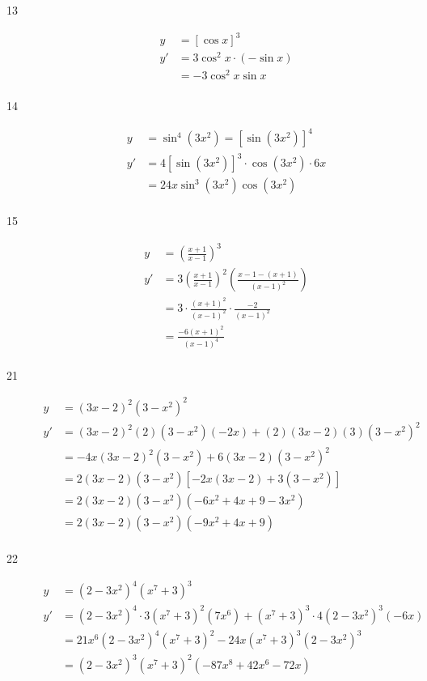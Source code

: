 \documentclass{exam}
\begin{document}
\begin{description}
\item[13]
\begin{align*}
  y  &= [ \cos x]^3 \\
  y' &= 3 \cos^2 x \cdot (- \sin x) \\
     &= -3 \cos^2 x \sin x \\
\end{align*}

\item[14]
\begin{align*}
  y  &= \sin^4(3x^2) = [\sin(3x^2)]^4 \\
  y' &= 4 [\sin (3x^2)]^3 \cdot \cos(3x^2) \cdot 6x \\
     &= 24x \sin^3(3x^2) \cos(3x^2) \\
\end{align*}

\item[15]
\begin{align*}
  y  &= \left( \frac{x+1}{x-1} \right)^3 \\
  y' &= 3 \left( \frac{x+1}{x-1} \right)^2 \left( \frac{x-1 - (x + 1)}{(x-1)^2} \right) \\
     &= 3 \cdot \frac{(x+1)^2}{(x-1)^2} \cdot \frac{-2}{(x-1)^2} \\
     &= \frac{-6 (x+1)^2}{(x-1)^4} \\
\end{align*}

\item[21]
\begin{align*}
  y  &= (3x - 2)^2 (3 - x^2)^2 \\
  y' &= (3x - 2)^2 (2)(3 - x^2)(-2x) + (2)(3x - 2)(3)(3-x^2)^2 \\
     &= -4x (3x - 2)^2(3 - x^2) + 6(3x - 2)(3-x^2)^2 \\
     &= 2(3x-2)(3-x^2) [-2x (3x - 2) + 3(3-x^2) ] \\
     &= 2(3x-2)(3-x^2)(-6x^2 + 4x + 9 - 3x^2) \\
     &= 2(3x-2)(3-x^2)(-9x^2 + 4x + 9) \\
\end{align*}

\item[22]
\begin{align*}
  y  &= (2 - 3x^2)^4(x^7 + 3)^3 \\
  y' &= (2 - 3x^2)^4 \cdot 3(x^7 + 3)^2(7x^6) +  (x^7 + 3)^3 \cdot 4(2 - 3x^2)^3(-6x) \\
     &= 21x^6 (2 - 3x^2)^4(x^7 + 3)^2 - 24x (x^7 + 3)^3(2 - 3x^2)^3 \\
     &= (2 - 3x^2)^3 (x^7 + 3)^2 (- 87x^8 + 42 x^6  - 72x) \\
\end{align*}


\end{description}
\end{document}
